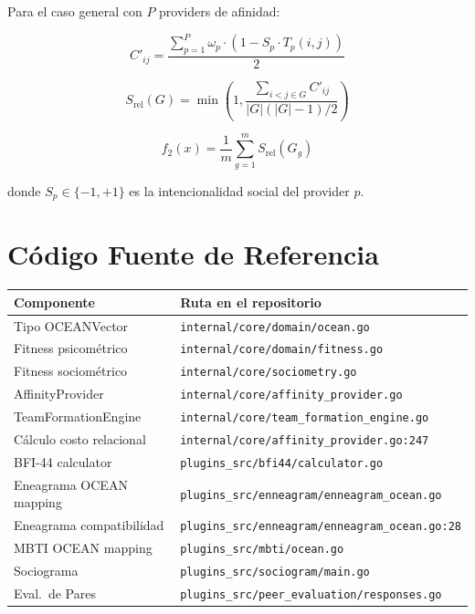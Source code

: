 \documentclass[12pt,a4paper]{article}
\begin{document}
Para el caso general con $P$ providers de afinidad:

\[
C'_{ij} = \frac{\sum_{p=1}^{P} \omega_p \cdot (1 - S_p \cdot T_p(i,j))}{2}
\]

\[
S_{\text{rel}}(G) = \min\left(1, \frac{\sum_{i<j \in G} C'_{ij}}{|G|(|G|-1)/2}\right)
\]

\[
f_2(x) = \frac{1}{m} \sum_{g=1}^{m} S_{\text{rel}}(G_g)
\]

donde $S_p \in \{-1, +1\}$ es la intencionalidad social del provider $p$.

\section{Código Fuente de Referencia}
\label{sec:code}

\begin{table}[h]
\centering
\small
\begin{tabular}{ll}
\toprule
\textbf{Componente} & \textbf{Ruta en el repositorio} \\
\midrule
Tipo OCEANVector & \texttt{internal/core/domain/ocean.go} \\
Fitness psicométrico & \texttt{internal/core/domain/fitness.go} \\
Fitness sociométrico & \texttt{internal/core/sociometry.go} \\
AffinityProvider & \texttt{internal/core/affinity\_provider.go} \\
TeamFormationEngine & \texttt{internal/core/team\_formation\_engine.go} \\
Cálculo costo relacional & \texttt{internal/core/affinity\_provider.go:247} \\
BFI-44 calculator & \texttt{plugins\_src/bfi44/calculator.go} \\
Eneagrama OCEAN mapping & \texttt{plugins\_src/enneagram/enneagram\_ocean.go} \\
Eneagrama compatibilidad & \texttt{plugins\_src/enneagram/enneagram\_ocean.go:28} \\
MBTI OCEAN mapping & \texttt{plugins\_src/mbti/ocean.go} \\
Sociograma & \texttt{plugins\_src/sociogram/main.go} \\
Eval.\ de Pares & \texttt{plugins\_src/peer\_evaluation/responses.go} \\
\bottomrule
\end{tabular}
\end{table}
\end{document}
